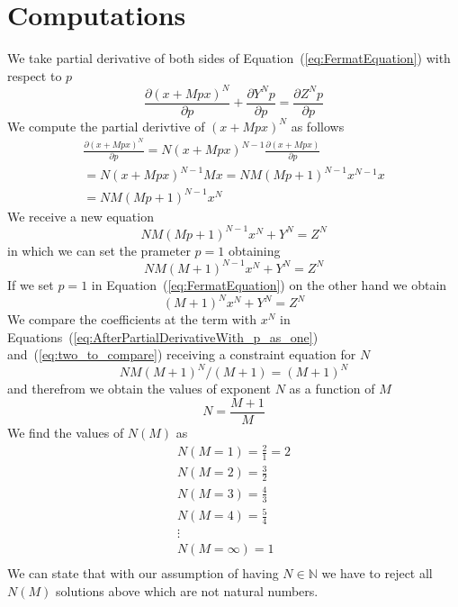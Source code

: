 \documentclass[SecEq,CM,GP]{degruyter-crelle} %
\theoremstyle{plain}
\theoremstyle{definition}
\begin{document}
\section{Computations}\label{sec:computations}

We take partial derivative of both sides of Equation~(\ref{eq:FermatEquation}) with respect to $p$ 
\begin{equation}
\label{eq:FermatEquationTakingDerivative}
\frac{\partial (x + Mpx)^N}{\partial p} + \frac{\partial Y^N p}{\partial p} = \frac{\partial Z^N p}{\partial p}
\end{equation}
We compute the partial derivtive of $(x + Mpx)^N$ as follows
\begin{eqnarray}
\frac{\partial (x + Mpx)^N}{\partial p}
=
N(x + Mpx)^{N-1}  \frac{\partial (x + Mpx)}{\partial p}   \\ \nonumber
=
N(x + Mpx)^{N-1} Mx 
=
NM  (Mp+1)^{N-1} x^{N-1}  x     \\  \nonumber
=
NM  (Mp+1)^{N-1}  x^N
\end{eqnarray}
We receive a new equation
\begin{equation}
NM  (Mp+1)^{N-1}  x^N + Y^{N} = Z^{N}
\end{equation}
in which we can set the prameter $p=1$ obtaining
\begin{equation}
\label{eq:AfterPartialDerivativeWith_p_as_one}
NM  (M+1)^{N-1}  x^N + Y^{N} = Z^{N}
\end{equation}
If we set $p=1$ in Equation~(\ref{eq:FermatEquation}) on the other hand we obtain
\begin{equation}
\label{eq:two_to_compare}
(M+1)^{N} x^{N} + Y^N  = Z^N
\end{equation}
We compare the coefficients at the term with $x^{N}$ in Equations~(\ref{eq:AfterPartialDerivativeWith_p_as_one}) 
and~(\ref{eq:two_to_compare})
receiving a constraint equation for $N$
\begin{equation}
\label{eq:constraint_for_N}
NM(M+1)^{N}/(M+1) = (M+1)^{N}
\end{equation}
and therefrom we obtain the values of exponent $N$ as a function of $M$
\begin{equation}
\label{eq:constraintNM}
N = \frac{M+1}{M}
\end{equation}
We find the values of $N(M)$ as
\begin{eqnarray}
\label{eq:constraint}
N(M=1) = \frac{2}{1} = 2    \\ \nonumber
N(M=2) = \frac{3}{2}        \\ \nonumber
N(M=3) = \frac{4}{3}        \\ \nonumber
N(M=4) = \frac{5}{4}        \\ \nonumber
\vdots                      \\ \nonumber
N(M=\infty) = 1             \\ \nonumber
\end{eqnarray}
We can state that with our assumption of having $N \in \mathbb{N}$ we have to reject
all $N(M)$ solutions above which are not natural numbers.
\end{document}
